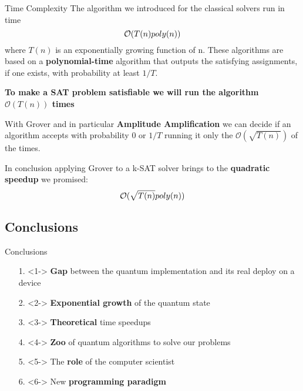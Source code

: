 		\begin{frame}{Time Complexity}
			\small
			The algorithm we introduced for the classical solvers run in time
			\vspace{-0.2cm}
			\begin{equation*}
				\centering
				\mathcal{O}(T(n)poly(n))
				\vspace{-0.2cm}
			\end{equation*}
			where $T(n)$ is an exponentially growing function of n. These algorithms are based on a \textbf{polynomial-time} algorithm that outputs the satisfying assignments, if one exists, with probability at least $1/T$.\\
			
			\vspace{0.2cm}
			
			\textbf{To make a SAT problem satisfiable we will run the algorithm $\mathcal{O}(T(n))$ times}\\
			
			\vspace{0.3cm}
			
			With Grover and in particular \textbf{Amplitude Amplification} we can decide if an algorithm accepts with probability $0$ or $1/T$ running it only the $\mathcal{O}(\sqrt{T(n)})$ of the times.\\
			
			\vspace{0.2cm}
			
			In conclusion applying Grover to a k-SAT solver brings to the \textbf{quadratic speedup} we promised:
			\vspace{-0.2cm}
			\begin{equation*}
				\centering
				\mathcal{O}(\sqrt{T(n)}poly(n))
			\end{equation*}  
		\end{frame}
		
	\subsection{Conclusions}
		\begin{frame}{Conclusions}
			\begin{itemize}
				\item[1.] <1-> \textbf{Gap} between the quantum implementation and its real deploy on a device
				
				\item[2.] <2-> \textbf{Exponential growth} of the quantum state
				
				\item[3.] <3-> \textbf{Theoretical} time speedups
				
				\item[4.] <4-> \textbf{Zoo} of quantum algorithms to solve our problems
				
				\item[5.] <5-> The \textbf{role} of the computer scientist
				
				\item[6.] <6-> New \textbf{programming paradigm}
			\end{itemize}
		\end{frame}
	
